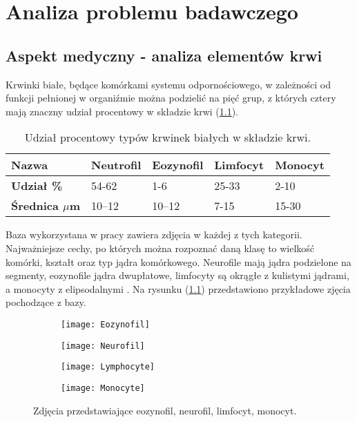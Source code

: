 \chapter{Analiza problemu badawczego}
\label{cha:analiza_problemu_badawczego}

\section{Aspekt medyczny - analiza elementów krwi}
Krwinki białe, będące komórkami systemu odpornościowego, w zależności od funkcji pełnionej w organiźmie można podzielić na pięć grup, z których cztery mają znaczny udział procentowy w składzie krwi (\ref{tab:blood_cells_percentage}).
\begin{table}[h]
\centering
\caption[Short Heading]{Udział procentowy typów krwinek białych w składzie krwi.}
\label{tab:blood_cells_percentage}
\begin{tabular}{|l|l|l|l|l|}
\hline
\textbf{Nazwa}                               & Neutrofil & Eozynofil & Limfocyt & Monocyt \\ \hline
\textbf{Udział \%}\cite{Wheater1979FunctionalHA} & 54-62   & 1-6    & 25-33  & 2-10  \\ \hline
\textbf{Średnica  \textbf{$\mu$}m}\cite{Wheater1979FunctionalHA} & 10–12  & 10–12 & 7-15  & 15-30  \\ \hline
\end{tabular}
\end{table}

{\parindent0pt %
Baza wykorzystana w pracy zawiera zdjęcia w każdej z tych kategorii. Najważniejsze cechy, po których można rozpoznać daną klasę to wielkość komórki, kształt oraz typ jądra komórkowego. Neurofile mają jądra podzielone na segmenty, eozynofile jądra dwupłatowe, limfocyty są okrągłe z kulistymi jądrami, a monocyty z elipsodalnymi \cite{lymphocytes_nucleus}. Na rysunku (\ref{fig:subcaption_example}) przedstawiono przykładowe zjęcia pochodzące z bazy.

\begin{figure}[h]
	\centering
	\begin{subfigure}{0.35\textwidth}
		\centering
		\texttt{[image: Eozynofil]}
		\subcaption{\label{subfigure_a}}
	\end{subfigure}
	\begin{subfigure}{0.35\textwidth}
		\centering
		\texttt{[image: Neurofil]}
		\subcaption{\label{subfigure_b}}
	\end{subfigure}
	\begin{subfigure}{0.35\textwidth}
		\centering
		\texttt{[image: Lymphocyte]}
		\subcaption{\label{subfigure_c}}
	\end{subfigure}
	\begin{subfigure}{0.35\textwidth}
		\centering
		\texttt{[image: Monocyte]}
		\subcaption{\label{subfigure_d}}
	\end{subfigure}
	
	\caption{Zdjęcia przedstawiające \protect{} eozynofil, \protect{} neurofil,  \protect{} limfocyt,  \protect{} monocyt.}
	\label{fig:subcaption_example}
\end{figure}
}
